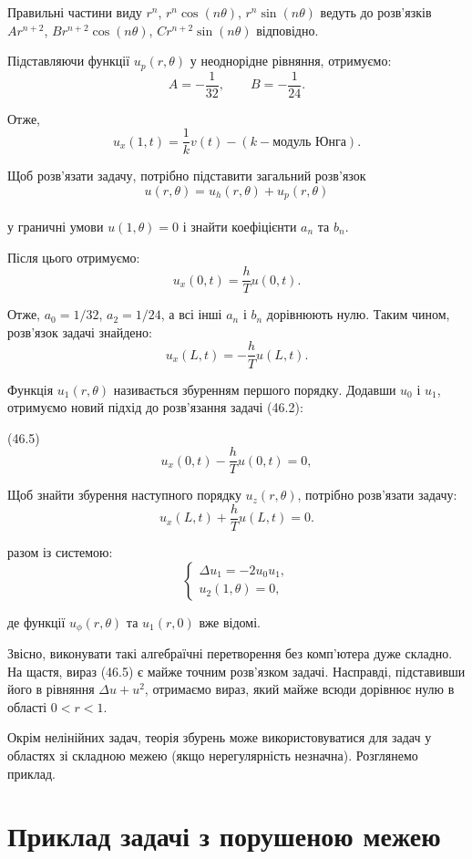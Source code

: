 \documentclass[
  ukrainian,
]{article}
\begin{document}
Правильні частини виду \(r^n\), \(r^n \cos(n\theta)\),
\(r^n \sin(n\theta)\) ведуть до розв'язків\\
\(Ar^{n+2}\), \(Br^{n+2} \cos(n\theta)\), \(Cr^{n+2} \sin(n\theta)\)
відповідно.

Підставляючи функції \(u_p(r,\theta)\) у неоднорідне рівняння,
отримуємо: \[
A = -\frac{1}{32}, \qquad B = -\frac{1}{24}.
\]

Отже, \[
u_x(1,t) = \frac{1}{k} v(t) - (k - \text{модуль Юнга}).
\]

Щоб розв'язати задачу, потрібно підставити загальний розв'язок\\
\[
u(r,\theta)=u_h(r,\theta)+u_p(r,\theta)
\]\\
у граничні умови \(u(1,\theta)=0\) і знайти коефіцієнти \(a_n\) та
\(b_n\).

Після цього отримуємо: \[
u_x(0,t) = \frac{h}{T} u(0,t).
\]

Отже, \(a_0=1/32\), \(a_2=1/24\), а всі інші \(a_n\) і \(b_n\)
дорівнюють нулю. Таким чином, розв'язок задачі знайдено: \[
u_x(L,t) = -\frac{h}{T} u(L,t).
\]

Функція \(u_1(r,\theta)\) називається збуренням першого порядку. Додавши
\(u_0\) і \(u_1\), отримуємо новий підхід до розв'язання задачі (46.2):

(46.5) \[
u_x(0,t) - \frac{h}{T}u(0,t) = 0,
\]

Щоб знайти збурення наступного порядку \(u_z(r,\theta)\), потрібно
розв'язати задачу: \[
u_x(L,t) + \frac{h}{T}u(L,t) = 0.
\]

разом із системою: \[
\begin{cases}
\Delta u_{1} = -2u_{0}u_{1}, \\
u_{2}(1,\theta) = 0,
\end{cases}
\]

де функції \(u_{\phi}(r,\theta)\) та \(u_{1}(r,0)\) вже відомі.

Звісно, виконувати такі алгебраїчні перетворення без комп'ютера дуже
складно. На щастя, вираз (46.5) є майже точним розв'язком задачі.
Насправді, підставивши його в рівняння \(\Delta u + u^{2}\), отримаємо
вираз, який майже всюди дорівнює нулю в області \(0 < r < 1\).

Окрім нелінійних задач, теорія збурень може використовуватися для задач
у областях зі складною межею (якщо нерегулярність незначна). Розглянемо
приклад.

\section{Приклад задачі з порушеною
межею}\label{ux43fux440ux438ux43aux43bux430ux434-ux437ux430ux434ux430ux447ux456-ux437-ux43fux43eux440ux443ux448ux435ux43dux43eux44e-ux43cux435ux436ux435ux44e}
\end{document}
